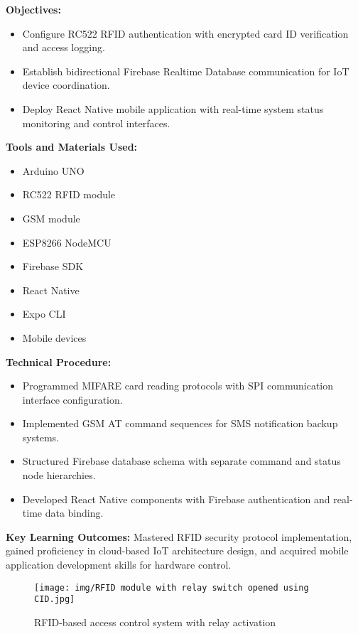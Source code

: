 \documentclass[12pt,a4paper]{report}
\begin{document}
\textbf{Objectives:}
\begin{itemize}
    \item Configure RC522 RFID authentication with encrypted card ID verification and access logging.
    \item Establish bidirectional Firebase Realtime Database communication for IoT device coordination.
    \item Deploy React Native mobile application with real-time system status monitoring and control interfaces.
\end{itemize}

\textbf{Tools and Materials Used:}
\begin{multicols}{2}
\begin{itemize}
    \item Arduino UNO
    \item RC522 RFID module
    \item GSM module
    \item ESP8266 NodeMCU
    \item Firebase SDK
    \item React Native
    \item Expo CLI
    \item Mobile devices
\end{itemize}
\end{multicols}

\noindent\textbf{Technical Procedure:}
\begin{itemize}
    \item Programmed MIFARE card reading protocols with SPI communication interface configuration.
    \item Implemented GSM AT command sequences for SMS notification backup systems.
    \item Structured Firebase database schema with separate command and status node hierarchies.
    \item Developed React Native components with Firebase authentication and real-time data binding.
\end{itemize}

\noindent\textbf{Key Learning Outcomes:} Mastered RFID security protocol implementation, gained proficiency in cloud-based IoT architecture design, and acquired mobile application development skills for hardware control.

\begin{figure}[H]
\centering
\texttt{[image: img/RFID module with relay switch opened using CID.jpg]}
\caption{RFID-based access control system with relay activation}
\label{fig:rfid-system}
\end{figure}
\end{document}
